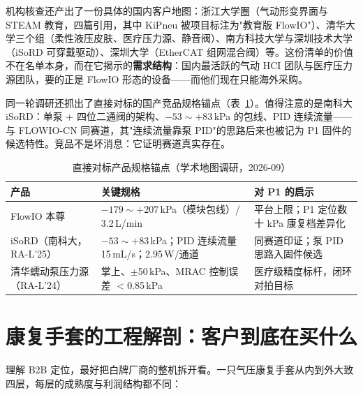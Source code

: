 机构核查还产出了一份具体的国内客户地图：浙江大学圈（气动形变界面与 STEAM 教育，四篇引用，其中 KiPneu 被项目标注为"教育版 FlowIO"）、清华大学三个组（柔性液压皮肤、医疗压力源、静音阀）、南方科技大学与深圳技术大学（iSoRD 可穿戴驱动）、深圳大学（EtherCAT 组网混合阀）等。这份清单的价值不在名单本身，而在它揭示的\textbf{需求结构}：国内最活跃的气动 HCI 团队与医疗压力源团队，要的正是 FlowIO 形态的设备——而他们现在只能海外采购。

同一轮调研还抓出了直接对标的国产竞品规格锚点（表~\ref{tab:intro-comp}）。值得注意的是南科大 iSoRD：单泵 + 四位二通阀的架构、$-53\sim+83$\,kPa 的包线、PID 连续流量——与 FLOWIO-CN 同赛道，其"连续流量靠泵 PID"的思路后来也被记为 P1 固件的候选特性。竞品不是坏消息：它证明赛道真实存在。

\begin{table}[htbp]
  \centering
  \caption{直接对标产品规格锚点（学术地图调研，2026-09）}
  \label{tab:intro-comp}
  \begin{tabular}{lp{4.2cm}p{4.4cm}}
    \toprule
    产品 & 关键规格 & 对 P1 的启示 \\
    \midrule
    FlowIO 本尊 & $-179\sim+207$\,kPa（模块包线）/ 3.2\,L/min & 平台上限；P1 定位数十 kPa 康复档差异化 \\
    iSoRD（南科大，RA-L'25） & $-53\sim+83$\,kPa；PID 连续流量 15\,mL/s；2.95\,W/通道 & 同赛道印证；泵 PID 思路入固件候选 \\
    清华蠕动泵压力源（RA-L'24） & 掌上、$\pm$50\,kPa、MRAC 控制误差 $<$0.85\,kPa & 医疗级精度标杆，闭环对拍目标 \\
    \bottomrule
  \end{tabular}
\end{table}

\section{康复手套的工程解剖：客户到底在买什么}
\label{sec:intro-anatomy}

理解 B2B 定位，最好把白牌厂商的整机拆开看。一只气压康复手套从内到外大致四层，每层的成熟度与利润结构都不同：

